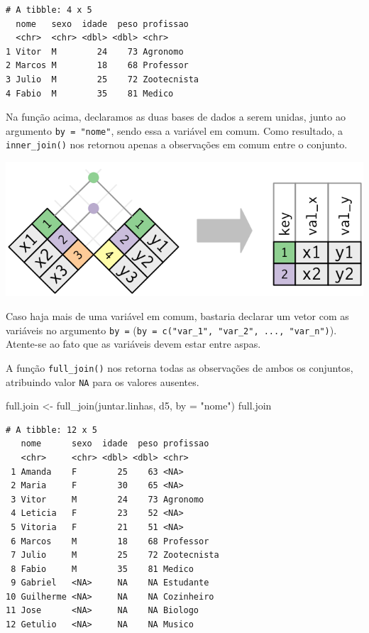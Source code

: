 \documentclass[
  brazilian,
]{book}
\newenvironment{Shaded}{\begin{snugshade}}{\end{snugshade}}
\newcommand{\AttributeTok}[1]{\textcolor[rgb]{0.77,0.63,0.00}{#1}}
\newcommand{\FunctionTok}[1]{\textcolor[rgb]{0.00,0.00,0.00}{#1}}
\newcommand{\NormalTok}[1]{#1}
\newcommand{\OtherTok}[1]{\textcolor[rgb]{0.56,0.35,0.01}{#1}}
\newcommand{\StringTok}[1]{\textcolor[rgb]{0.31,0.60,0.02}{#1}}
\let\origfigure\figure
\let\endorigfigure\endfigure
\renewenvironment{figure}[1][2] {
    \expandafter\origfigure\expandafter[H]
} {
    \endorigfigure
}
\begin{document}
\begin{verbatim}
# A tibble: 4 x 5
  nome   sexo  idade  peso profissao  
  <chr>  <chr> <dbl> <dbl> <chr>      
1 Vitor  M        24    73 Agronomo   
2 Marcos M        18    68 Professor  
3 Julio  M        25    72 Zootecnista
4 Fabio  M        35    81 Medico     
\end{verbatim}

Na função acima, declaramos as duas bases de dados a serem unidas, junto ao argumento \texttt{by\ =\ "nome"}, sendo essa a variável em comum. Como resultado, a \texttt{inner\_join()} nos retornou apenas a observações em comum entre o conjunto.

\begin{figure}

{\centering \includegraphics[width=0.5\linewidth]{imagens/join-inner} 

}

\caption{Esquematização da função $inner_join$. Fonte: R for Data Science, 2017.}\label{fig:unnamed-chunk-173}
\end{figure}

Caso haja mais de uma variável em comum, bastaria declarar um vetor com as variáveis no argumento \texttt{by\ =} (\texttt{by\ =\ c("var\_1",\ "var\_2",\ ...,\ "var\_n")}). Atente-se ao fato que as variáveis devem estar entre aspas.

A função \texttt{full\_join()} nos retorna todas as observações de ambos os conjuntos, atribuindo valor \texttt{NA} para os valores ausentes.

\begin{Shaded}
\begin{Highlighting}[]
\NormalTok{full.join }\OtherTok{\textless{}{-}} \FunctionTok{full\_join}\NormalTok{(juntar.linhas, d5, }\AttributeTok{by =} \StringTok{"nome"}\NormalTok{)}
\NormalTok{full.join}
\end{Highlighting}
\end{Shaded}

\begin{verbatim}
# A tibble: 12 x 5
   nome      sexo  idade  peso profissao  
   <chr>     <chr> <dbl> <dbl> <chr>      
 1 Amanda    F        25    63 <NA>       
 2 Maria     F        30    65 <NA>       
 3 Vitor     M        24    73 Agronomo   
 4 Leticia   F        23    52 <NA>       
 5 Vitoria   F        21    51 <NA>       
 6 Marcos    M        18    68 Professor  
 7 Julio     M        25    72 Zootecnista
 8 Fabio     M        35    81 Medico     
 9 Gabriel   <NA>     NA    NA Estudante  
10 Guilherme <NA>     NA    NA Cozinheiro 
11 Jose      <NA>     NA    NA Biologo    
12 Getulio   <NA>     NA    NA Musico     
\end{verbatim}
\end{document}

